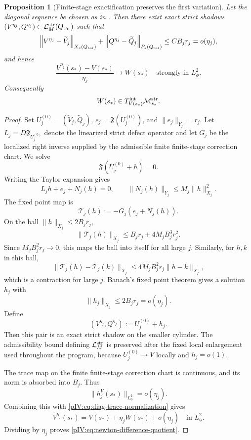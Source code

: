 \documentclass[11pt]{article}
\numberwithin{equation}{section}
\theoremstyle{plain}
\newtheorem{proposition}{Proposition}[section]
\theoremstyle{definition}
\theoremstyle{remark}
\newcommand{\norm}[2]{\left\|#1\right\|_{#2}}
\newcommand{\Mstr}{\mathcal M^{\rm str}}
\newcommand{\Lstr}{\mathcal L^{\rm str}}
\newcommand{\Tint}{T^{\rm int}}
\begin{document}
\begin{proposition}[Finite-stage exactification preserves the first variation]
\label{pIV:prop:newton-exactification}
Let the diagonal sequence be chosen as in . Then there
exist exact strict shadows \((V^{\eta_j},Q^{\eta_j})\in\Lstr_M(Q_{\rm tar})\) such
that
\begin{equation}\label{pIV:eq:newton-correction-bound}
        \norm{V^{\eta_j}-\widetilde V_j}{X_s(Q_{\rm tar})}
        +
        \norm{Q^{\eta_j}-\widetilde Q_j}{P_s(Q_{\rm tar})}
        \le C B_jr_j=o(\eta_j),
\end{equation}
and hence
\begin{equation}\label{pIV:eq:newton-difference-quotient}
        \frac{V^{\eta_j}(s_*)-V(s_*)}{\eta_j}
        \longrightarrow W(s_*)
        \quad\text{strongly in }L^2_\phi.
\end{equation}
Consequently
\[
        W(s_*)\in \Tint_{V(s_*)}\Mstr_{s_*}.
\]
\end{proposition}

\begin{proof}
Set \(U_j^{(0)}=(\widetilde V_j,\widetilde Q_j)\),
\(e_j=\mathfrak F(U_j^{(0)})\), and \(\|e_j\|_{Y_j}=r_j\). Let
\(L_j=D\mathfrak F_{U_j^{(0)}}\) denote the linearized strict defect operator and let
\(G_j\) be the localized right inverse supplied by the admissible finite finite-stage correction chart.
We solve
\[
        \mathfrak F(U_j^{(0)}+h)=0.
\]
Writing the Taylor expansion gives
\[
        L_jh+e_j+N_j(h)=0,
        \qquad
        \|N_j(h)\|_{Y_j}\le M_j\|h\|_{X_j}^2.
\]
The fixed point map is
\[
        \mathcal T_j(h):=-G_j(e_j+N_j(h)).
\]
On the ball \(\|h\|_{X_j}\le 2B_jr_j\),
\[
        \|\mathcal T_j(h)\|_{X_j}
        \le B_jr_j+4M_jB_j^3r_j^2.
\]
Since \(M_jB_j^2r_j\to0\), this maps the ball into itself for all large \(j\). Similarly,
for \(h,k\) in this ball,
\[
        \|\mathcal T_j(h)-\mathcal T_j(k)\|_{X_j}
        \le 4M_jB_j^2r_j\|h-k\|_{X_j},
\]
which is a contraction for large \(j\). Banach's fixed point theorem gives a solution
\(h_j\) with
\[
        \|h_j\|_{X_j}\le 2B_jr_j=o(\eta_j).
\]
Define
\[
        (V^{\eta_j},Q^{\eta_j}):=U_j^{(0)}+h_j.
\]
Then this pair is an exact strict shadow on the smaller cylinder. The admissibility
bound defining \(\Lstr_M\) is preserved after the fixed local enlargement used
throughout the program, because \(U_j^{(0)}\to V\) locally and \(h_j=o(1)\).

The trace map on the finite finite-stage correction chart is continuous, and its norm is absorbed into
\(B_j\). Thus
\[
        \|h_j^V(s_*)\|_{L^2_\phi}=o(\eta_j).
\]
Combining this with \eqref{pIV:eq:diag-trace-normalization} gives
\[
        V^{\eta_j}(s_*)=V(s_*)+
        \eta_jW(s_*)+o(\eta_j)
        \quad\text{in }L^2_\phi.
\]
Dividing by \(\eta_j\) proves \eqref{pIV:eq:newton-difference-quotient}.
\end{proof}
\end{document}
